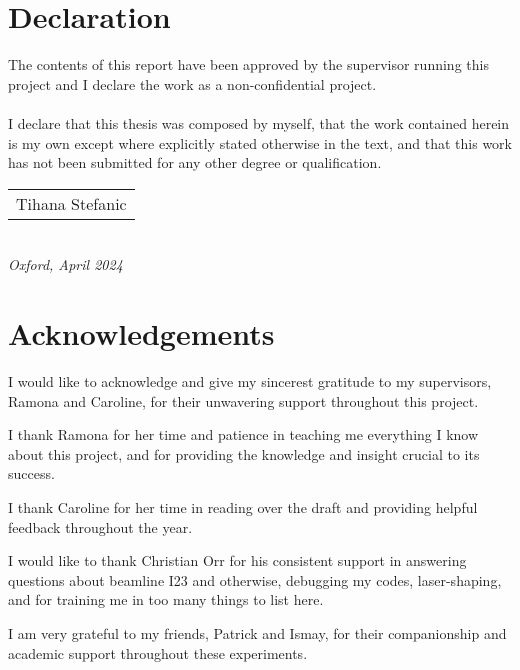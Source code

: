 %

\newpage
\setcounter{page}{1}
\section*{Declaration}
The contents of this report have been approved by the supervisor running this project and I declare the work as a non-confidential project.\\\\
I declare that this thesis was composed by myself, that the work contained herein is my own except where explicitly stated otherwise in the text, and that this work has not been submitted for any other degree or qualification. \\
\bigskip


\begin{flushright}
	\begin{tabular}{m{5cm}}
		\\ \hline
		\centering Tihana Stefanic \\
		
	\end{tabular}\\
	
	\raggedleft\textit{Oxford, April 2024}
\end{flushright}
\newpage

\section*{Acknowledgements}

I would like to acknowledge and give my sincerest gratitude to my supervisors, Ramona and Caroline, for their unwavering support throughout this project.

I thank Ramona for her time and patience in teaching me everything I know about this project, and for providing the knowledge and insight crucial to its success.

I thank Caroline for her time in reading over the draft and providing helpful feedback throughout the year.

I would like to thank Christian Orr for his consistent support in answering questions about beamline I23 and otherwise, debugging my codes, laser-shaping, and for training me in too many things to list here. %

I am very grateful to my friends, Patrick and Ismay, for their companionship and academic support throughout these experiments.
\newpage

